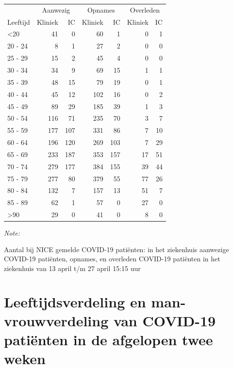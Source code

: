 \documentclass[
  english,
  man,floatsintext]{apa6}
\begin{document}
\begin{table}
\centering\begingroup\fontsize{10}{12}\selectfont

\begin{threeparttable}
\begin{tabular}{lrrrrrr}
\toprule
\multicolumn{1}{c}{ } & \multicolumn{2}{c}{Aanwezig} & \multicolumn{2}{c}{Opnames} & \multicolumn{2}{c}{Overleden} \\
\cmidrule(l{3pt}r{3pt}){2-3} \cmidrule(l{3pt}r{3pt}){4-5} \cmidrule(l{3pt}r{3pt}){6-7}
Leeftijd & Kliniek & IC & Kliniek & IC & Kliniek & IC\\
\midrule
<20 & 41 & 0 & 60 & 1 & 0 & 1\\
20 - 24 & 8 & 1 & 27 & 2 & 0 & 0\\
25 - 29 & 15 & 2 & 45 & 4 & 0 & 0\\
30 - 34 & 34 & 9 & 69 & 15 & 1 & 1\\
35 - 39 & 48 & 15 & 79 & 19 & 0 & 1\\
40 - 44 & 45 & 12 & 102 & 16 & 0 & 2\\
45 - 49 & 89 & 29 & 185 & 39 & 1 & 3\\
50 - 54 & 116 & 71 & 235 & 70 & 3 & 7\\
55 - 59 & 177 & 107 & 331 & 86 & 7 & 10\\
60 - 64 & 196 & 120 & 269 & 103 & 7 & 29\\
65 - 69 & 233 & 187 & 353 & 157 & 17 & 51\\
70 - 74 & 279 & 177 & 384 & 155 & 39 & 44\\
75 - 79 & 277 & 80 & 379 & 55 & 77 & 26\\
80 - 84 & 132 & 7 & 157 & 13 & 51 & 7\\
85 - 89 & 62 & 1 & 57 & 0 & 27 & 0\\
>90 & 29 & 0 & 41 & 0 & 8 & 0\\
\bottomrule
\end{tabular}
\begin{tablenotes}
\item \textit{Note: } 
\item Aantal bij NICE gemelde COVID-19 patiënten: in het ziekenhuis aanwezige COVID-19 patiënten, opnames, en overleden COVID-19 patiënten in het ziekenhuis van 13 april t/m 27 april 15:15 uur
\end{tablenotes}
\end{threeparttable}
\endgroup{}
\end{table}

\newpage

\hypertarget{leeftijdsverdeling-en-man-vrouwverdeling-van-covid-19-patiuxebnten-in-de-afgelopen-twee-weken}{%
\section{Leeftijdsverdeling en man-vrouwverdeling van COVID-19 patiënten in de afgelopen twee weken}\label{leeftijdsverdeling-en-man-vrouwverdeling-van-covid-19-patiuxebnten-in-de-afgelopen-twee-weken}}
\end{document}
